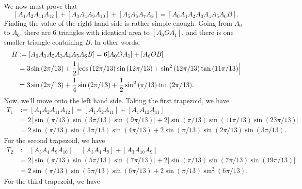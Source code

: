 \begin{solution}{5}
    We now must prove that
    \[
        [A_1 A_2 A_{11} A_{12}] + [A_3 A_4 A_9 A_{10}] + [A_5 A_6 A_7 A_8] = [A_0 A_1 A_2 A_3 A_4 A_5 A_6 B]
    .\]
    Finding the value of the right hand side is rather simple enough. Going from \( A_0 \) to \( A_6 \), there are \( 6 \) triangles with identical area to \( [A_0 O A_1] \), and there is one smaller triangle containing \( B \). In other words,
    \begin{align*}
        H &:= [A_0 A_1 A_2 A_3 A_4 A_5 A_6 B] = 6 [A_0 O A_1] + [A_6 O B] \\
        &= 3 \sin{\left( 2 \pi / 13 \right)} + \frac{1}{2} \Bigl| \cos{\left( 12 \pi / 13 \right)} \sin{\left( 12 \pi / 13 \right)} + \sin^2{\left( 12 \pi / 13 \right)} \tan{\left( 11 \pi / 13 \right)} \Bigr| \\
        &= 3 \sin{\left( 2 \pi / 13 \right)} + \frac{1}{4} \sin{\left( 2 \pi / 13 \right)} + \frac{1}{2} \sin^2{\left( \pi / 13 \right)} \tan{\left( 2 \pi / 13 \right)}
    .\end{align*}
    Now, we'll move onto the left hand side. Taking the first trapezoid, we have
    \begin{align*}
        T_1 &:= [A_1 A_2 A_{11} A_{12}] = [A_1 A_2 A_{11}] + [A_1 A_{12} A_{11}] \\
        &= 2 \left| \sin{\left( \pi / 13 \right)} \sin{\left( 3 \pi / 13 \right)} \sin{\left( 9 \pi / 13 \right)} \right| + 2 \left| \sin{\left( \pi / 13 \right)} \sin{\left( 11 \pi / 13 \right)} \sin{\left( 23 \pi / 13 \right)} \right| \\
        &= 2 \sin{\left( \pi / 13 \right)} \sin{\left( 3 \pi / 13 \right)} \sin{\left( 4 \pi / 13 \right)} + 2 \sin{\left( \pi / 13 \right)} \sin{\left( 2 \pi / 13 \right)} \sin{\left( 3 \pi / 13 \right)}
    .\end{align*}
    For the second trapezoid, we have
    \begin{align*}
        T_2 &:= [A_3 A_4 A_9 A_{10}] = [A_3 A_4 A_9] + [A_3 A_{10} A_9] \\
        &= 2 \left| \sin{\left( \pi / 13 \right)} \sin{\left( 5 \pi / 13 \right)} \sin{\left( 7 \pi / 13 \right)} \right| + 2 \left| \sin{\left( \pi / 13 \right)} \sin{\left( 7 \pi / 13 \right)} \sin{\left( 19 \pi / 13 \right)} \right| \\
        &= 2 \sin{\left( \pi / 13 \right)} \sin{\left( 5 \pi / 13 \right)} \sin{\left( 6 \pi / 13 \right)} + 2 \sin{\left( \pi / 13 \right)} \sin^2{\left( 6 \pi / 13 \right)}
    .\end{align*}
    For the third trapezoid, we have

\end{solution}
